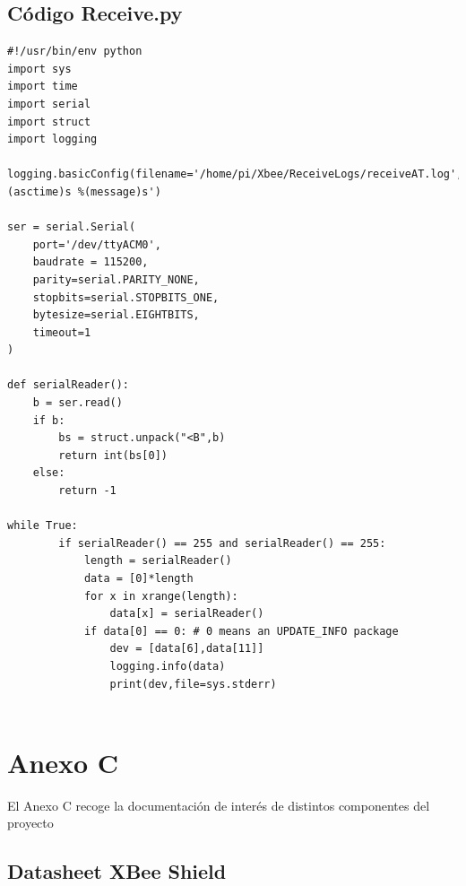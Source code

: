 \section{Código Receive.py}\label{anexo:receive}

\begin{lstlisting}[frame=leftline, caption={Receive.py}, label=code:Receive]
#!/usr/bin/env python
import sys
import time
import serial
import struct
import logging

logging.basicConfig(filename='/home/pi/Xbee/ReceiveLogs/receiveAT.log',level=logging.DEBUG,format='%(asctime)s %(message)s')

ser = serial.Serial(
	port='/dev/ttyACM0',
	baudrate = 115200,
	parity=serial.PARITY_NONE,
	stopbits=serial.STOPBITS_ONE,
	bytesize=serial.EIGHTBITS,
	timeout=1
)

def serialReader():
    b = ser.read()
    if b:
        bs = struct.unpack("<B",b)
        return int(bs[0])
    else:
        return -1

while True:
        if serialReader() == 255 and serialReader() == 255:
            length = serialReader()
            data = [0]*length
            for x in xrange(length):
                data[x] = serialReader()
            if data[0] == 0: # 0 means an UPDATE_INFO package
                dev = [data[6],data[11]]
                logging.info(data)
                print(dev,file=sys.stderr)
                
\end{lstlisting}

\chapter{Anexo C}

El Anexo C recoge la documentación de interés de distintos componentes del proyecto

\section{Datasheet XBee Shield}